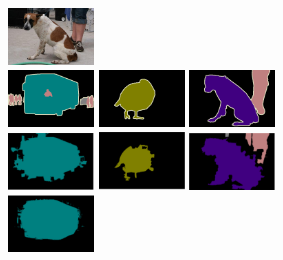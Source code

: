 \begin{figure}[h!]
\begin{subfigure}{0.4\textwidth}
		\includegraphics[width=0.25\textwidth]{image/result/compare/2009_004507.jpg} 
		\\
		\includegraphics[width=0.25\textwidth]{image/result/compare/2010_005284.png}
		\includegraphics[width=0.25\textwidth]{image/result/compare/2007_003349.png}
		\includegraphics[width=0.25\textwidth]{image/result/compare/2009_004507.png} \\
		\includegraphics[width=0.25\textwidth]{image/result/compare/zoom_bus.png}
		\includegraphics[width=0.25\textwidth]{image/result/compare/zoom_bird.png}
		\includegraphics[width=0.25\textwidth]{image/result/compare/zoom_dog.png} \\
		\includegraphics[width=0.25\textwidth]{image/result/compare/deeplab_bus.png}

\end{subfigure}
\end{figure}
